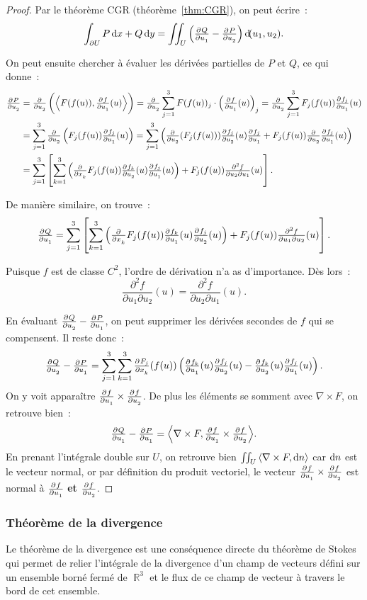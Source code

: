 \documentclass{article}
\DeclareMathOperator{\R}{\mathbb R}
\newcommand{\scpr}[2]{{\left\langle#1, #2\right\rangle}}
\newcommand{\rot}[1]{\nabla \times #1}
\theoremstyle{definition}
\theoremstyle{remark}
\begin{document}
\begin{proof}
		Par le théorème CGR (théorème~\ref{thm:CGR}), on peut écrire~:
		\[\int_{\partial U}P\dif x + Q\dif y = \iint_U\left(\pd Q{u_1} - \pd P{u_2}\right)\dif (u_1, u_2).\]

		On peut ensuite chercher à évaluer les dérivées partielles de $P$ et $Q$, ce qui donne~:
		\begin{align*}
			\pd P{u_2} &= \pd {}{u_2}\left(\scpr {F(f(u))}{\pd f{u_1}(u)}\right) = \pd {}{u_2}\sum_{j=1}^3F(f(u))_j\cdot \left(\pd f{u_1}(u)\right)_j
				= \pd {}{u_2}\sum_{j=1}^3F_j(f(u))\pd {f_j}{u_1}(u) \\
			&= \sum_{j=1}^3\pd {}{u_2}\left(F_j(f(u))\pd {f_j}{u_1}(u)\right)
				= \sum_{j=1}^3\left(\pd {}{u_2}(F_j(f(u)))\pd {f_j}{u_2}(u)\pd {f_j}{u_1} + F_j(f(u))\pd {}{u_2}\pd {f_j}{u_1}(u)\right) \\
			&= \sum_{j=1}^3\left[\sum_{k=1}^3\left(\pd {}{x_k}F_j(f(u))\pd {f_k}{u_2}(u)\pd {f_j}{u_1}(u)\right)
					+ F_j(f(u))\textstyle\frac {\partial^2 f}{\partial u_2\partial u_1}(u)\right].
		\end{align*}

		De manière similaire, on trouve~:
		\[\pd Q{u_1} = \sum_{j=1}^3\left[\sum_{k=1}^3\left(\pd {}{x_k}F_j(f(u))\pd {f_k}{u_1}(u)\pd {f_j}{u_2}(u)\right)
					+ F_j(f(u))\textstyle\frac {\partial^2 f}{\partial u_1\partial u_2}(u)\right].\]

		Puisque $f$ est de classe $C^2$, l'ordre de dérivation n'a as d'importance. Dès lors~:
		\[\frac {\partial^2 f}{\partial u_1\partial u_2}(u) = \frac {\partial^2 f}{\partial u_2\partial u_1}(u).\]

		En évaluant $\pd Q{u_2} - \pd P{u_1}$, on peut supprimer les dérivées secondes de $f$ qui se compensent. Il reste donc~:
		\[\pd Q{u_2} - \pd P{u_1} = \sum_{j=1}^3\sum_{k=1}^3\pd {F_j}{x_k}(f(u))\left(\pd {f_k}{u_1}(u)\pd {f_j}{u_2}(u) - \pd{f_k}{u_2}(u)\pd {f_j}{u_1}(u)\right).\]
		On y voit apparaître $\pd f{u_1} \times \pd f{u_2}$. De plus les éléments se somment avec $\rot F$, on retrouve bien~:
		\[\pd Q{u_1} - \pd P{u_1} = \scpr {\rot F}{\pd f{u_1} \times \pd f{u_2}}.\]
		En prenant l'intégrale double sur $U$, on retrouve bien $\iint_U\scpr {\rot F}{\dif n}$ car $\dif n$ est le vecteur normal, or par définition du produit
		vectoriel, le vecteur $\pd f{u_1} \times \pd f{u_2}$ est normal à $\pd f{u_1}$ \textbf{et} $\pd f{u_2}$.
		\end{proof}

		\subsubsection{Théorème de la divergence}
		Le théorème de la divergence est une conséquence directe du théorème de Stokes qui permet de relier l'intégrale de la divergence d'un champ de vecteurs
		défini sur un ensemble borné fermé de $\R^3$ et le flux de ce champ de vecteur à travers le bord de cet ensemble.
\end{document}
